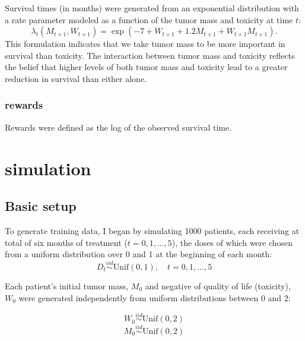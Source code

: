 \documentclass[12pt]{article}
\begin{document}
Survival times (in months) were generated from an exponential distribution with a rate parameter modeled as a function of the tumor mass and toxicity at time $t$:
\begin{equation}
  \lambda_{t}(M_{t+1}, W_{t+1}) = \exp(-7 + W_{t+1} + 1.2 M_{t+1} + W_{t+1} M_{t+1}).
\end{equation}
This formulation indicates that we take tumor mass to be more important in survival than toxicity. The interaction between tumor mass and toxicity reflects the belief that higher levels of both tumor mass and toxicity lead to a greater reduction in survival than either alone.




\subsubsection{rewards} %
\label{sub:}

Rewards were defined as the log of the observed survival time.


\section{simulation} %
\label{sec:simulation}

\subsection{Basic setup} %
\label{sub:basic_setup}

To generate training data, I began by simulating 1000 patients, each receiving at total of six months of treatment ($t = 0, 1, \ldots, 5$), the doses of which were chosen from a uniform distribution over 0 and 1 at the beginning of each month:
\begin{equation}
  D_{t} \overset{iid}{\sim} \text{Unif}(0, 1), \quad t = 0, 1, \ldots, 5
\end{equation}

Each patient's initial tumor mass, $M_{0}$ and negative of quality of life (toxicity), $W_{0}$ were generated independently from uniform distributions between 0 and 2:

\begin{equation}
  W_{0} \overset{iid}{\sim} \text{Unif}(0, 2)
\end{equation}
\begin{equation}
  M_{0} \overset{iid}{\sim} \text{Unif}(0, 2)
\end{equation}
\end{document}
